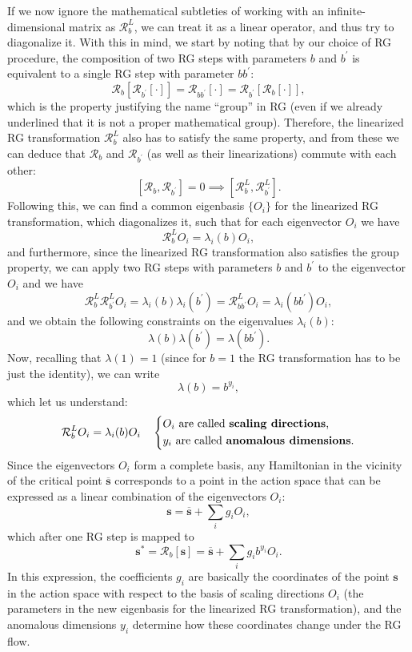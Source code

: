 If we now ignore the mathematical subtleties of working with an infinite-dimensional matrix as \(\mathcal{R}_b^L\), we can treat it as a linear operator, and thus try to diagonalize it. With this in mind, we start by noting that by our choice of RG procedure, the composition of two RG steps with parameters \(b\) and \(b^{\prime}\) is equivalent to a single RG step with parameter \(bb^{\prime}\):
\[
    \mathcal{R}_b \left[\mathcal{R}_{b^{\prime}} [\cdot] \right] = \mathcal{R}_{bb^{\prime}} [\cdot] = \mathcal{R}_{b^{\prime}} \left[\mathcal{R}_b [\cdot] \right],
\]
which is the property justifying the name ``group'' in RG (even if we already underlined that it is not a proper mathematical group). Therefore, the linearized RG transformation \(\mathcal{R}_b^L\) also has to satisfy the same property, and from these we can deduce that \(\mathcal{R}_b\) and \(\mathcal{R}_{b^{\prime}}\) (as well as their linearizations) commute with each other:
\[
    \left[ \mathcal{R}_b, \mathcal{R}_{b^{\prime}} \right] = 0 \implies \left[ \mathcal{R}_b^L, \mathcal{R}_{b^{\prime}}^L \right].
\]
Following this, we can find a common eigenbasis \(\{O_i\}\) for the linearized RG transformation, which diagonalizes it, such that for each eigenvector \(O_i\) we have
\[
    \mathcal{R}_b^L O_i = \lambda_i(b) O_i,
\]
and furthermore, since the linearized RG transformation also satisfies the group property, we can apply two RG steps with parameters \(b\) and \(b^{\prime}\) to the eigenvector \(O_i\) and we have
\[
    \mathcal{R}^L_b \mathcal{R}^L_{b^{\prime}} O_i = \lambda_i(b)\lambda_i(b^{\prime}) = \mathcal{R}^L_{bb^{\prime}} O_i = \lambda_i(bb^{\prime}) O_i,
\]
and we obtain the following constraints on the eigenvalues \(\lambda_i(b)\):
\[
    \lambda(b)\lambda(b^{\prime}) = \lambda(bb^{\prime}).
\]
Now, recalling that \(\lambda(1) = 1\) (since for \(b=1\) the RG transformation has to be just the identity), we can write
\[
    \lambda(b) = b^{y_i},
\]
which let us understand:
\[
    \mathcal{R}_b^L O_i = \lambda_i(b) O_i \quad \begin{dcases}
        O_i \text{ are called \textbf{scaling directions},} \\
        y_i \text{ are called \textbf{anomalous dimensions}.}
    \end{dcases}
\]
Since the eigenvectors \(O_i\) form a complete basis, any Hamiltonian in the vicinity of the critical point \(\overline{\mathbf{s}}\) corresponds to a point in the action space that can be expressed as a linear combination of the eigenvectors \(O_i\):
\[
    \mathbf{s} = \overline{\mathbf{s}} + \sum_{i} g_i O_i,
\]
which after one RG step is mapped to
\[
    \mathbf{s}^* = \mathcal{R}_b[\mathbf{s}] = \overline{\mathbf{s}} + \sum_{i} g_i b^{y_i} O_i.
\]
In this expression, the coefficients \(g_i\) are basically the coordinates of the point \(\mathbf{s}\) in the action space with respect to the basis of scaling directions \(O_i\) (the parameters in the new eigenbasis for the linearized RG transformation), and the anomalous dimensions \(y_i\) determine how these coordinates change under the RG flow.

